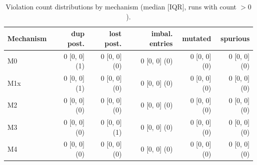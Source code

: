 
\begin{table}[htbp]
\centering
\small
\caption{Violation count distributions by mechanism (median [IQR], runs with count $>0$).}
\label{tab:counts}
\begin{tabular}{lrrrrr}
\toprule
\textbf{Mechanism} & \textbf{dup post.} & \textbf{lost post.} & \textbf{imbal. entries} & \textbf{mutated} & \textbf{spurious} \\
\midrule
M0 & 0 [0, 0] (1) & 0 [0, 0] (0) & 0 [0, 0] (0) & 0 [0, 0] (0) & 0 [0, 0] (0) \\
M1x & 0 [0, 0] (1) & 0 [0, 0] (0) & 0 [0, 0] (0) & 0 [0, 0] (0) & 0 [0, 0] (0) \\
M2 & 0 [0, 0] (0) & 0 [0, 0] (0) & 0 [0, 0] (0) & 0 [0, 0] (0) & 0 [0, 0] (0) \\
M3 & 0 [0, 0] (0) & 0 [0, 0] (1) & 0 [0, 0] (0) & 0 [0, 0] (0) & 0 [0, 0] (0) \\
M4 & 0 [0, 0] (0) & 0 [0, 0] (0) & 0 [0, 0] (0) & 0 [0, 0] (0) & 0 [0, 0] (0) \\
\bottomrule
\end{tabular}
\end{table}
